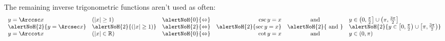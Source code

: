 \begin{frame}[t]
The remaining inverse trigonometric functions aren't used as often:
\[
\begin{array}{llcrcl}
y = \Arccsc x &%
(|x| \geq 1) &%
\alertNoH{0}{\Leftrightarrow}&%
\csc y = x &%
\text{ and } &%
y\in \left(0,\frac{\pi}{2}\right] \cup \left(\pi , \frac{3\pi}{2} \right] \\%
\alertNoH{2}{y = \Arcsec x }&%
\alertNoH{2}{(|x| \geq 1) }&%
\alertNoH{2}{\Leftrightarrow}&%
\alertNoH{2}{\sec y = x }&%
\alertNoH{2}{\text{ and } }&%
\alertNoH{2}{y\in  \left[0,\frac{\pi}{2}\right) \cup \left[\pi , \frac{3\pi}{2}\right) }\\%
y = \Arccot x &%
(|x| \in \mathbb{R}) &%
\alertNoH{0}{\Leftrightarrow}&%
\cot y = x &%
\text{ and } &%
y\in (0,\pi )
\end{array}
\]
\end{frame}
